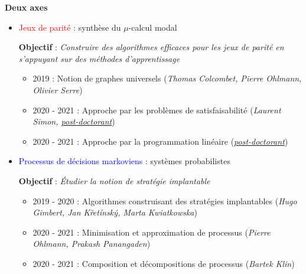 \documentclass[svgnames]{beamer}
\begin{document}
\begin{frame}
\textbf{Deux axes}
\begin{itemize}
	\item \textcolor{red}{Jeux de parit{\'e}} : synth{\`e}se du $\mu$-calcul modal

	\textbf{Objectif} : \textit{Construire des algorithmes efficaces pour les jeux de parit{\'e} en s'appuyant sur des
m{\'e}thodes d'apprentissage}

	\begin{itemize}
		\item 2019 : Notion de graphes universels (\textit{Thomas Colcombet, Pierre Ohlmann, Olivier Serre})

		\item 2020 - 2021 : Approche par les probl{\`e}mes de satisfaisabilit{\'e} (\textit{Laurent Simon, \underline{post-doctorant}})

		\item 2020 - 2021 : Approche par la programmation lin{\'e}aire
		(\textit{\underline{post-doctorant}})
	\end{itemize}

	\item \textcolor{blue}{Processus de d{\'e}cisions markoviens} : syst{\`e}mes probabilistes
	
	\textbf{Objectif} : \textit{{\'E}tudier la notion de strat{\'e}gie implantable}

		\begin{itemize}
		\item 2019 - 2020 : Algorithmes construisant des strat{\'e}gies implantables (\textit{Hugo Gimbert, Jan K{\v r}et{\'i}nsk{\'y}, Marta Kwiatkowska})

		\item 2020 - 2021 : Minimisation et approximation de processus (\textit{Pierre Ohlmann, Prakash Panangaden})
		
		\item 2020 - 2021 : Composition et d{\'e}compositions de processus (\textit{Bartek Klin})		

	\end{itemize}
\end{itemize}
\end{frame}
\end{document}

